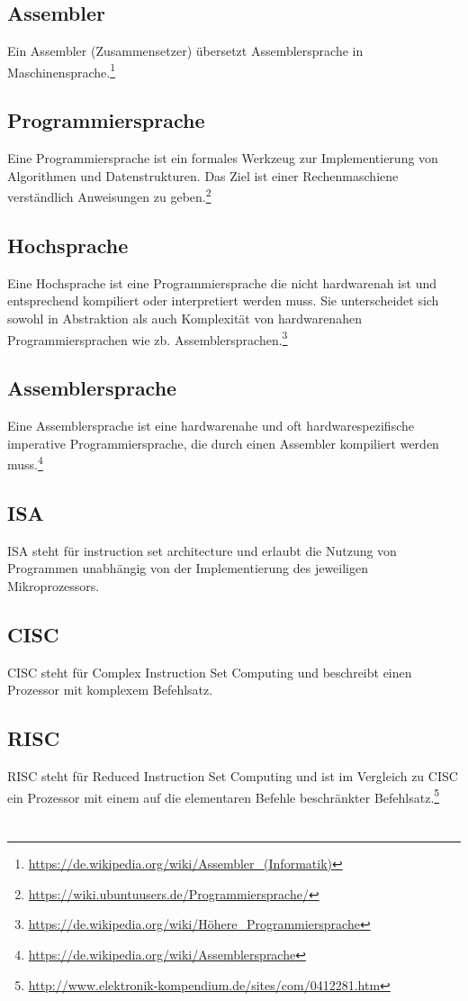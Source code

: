 \documentclass[
	11pt,								%
	parskip=half-,						%
	paper=a4,							%
	english,ngerman,					%
	]{scrartcl}							%
\begin{document}
\subsection*{Assembler}
Ein Assembler (Zusammensetzer) übersetzt Assemblersprache in Maschinensprache.\footnote{\url{https://de.wikipedia.org/wiki/Assembler\_(Informatik)}}

\subsection*{Programmiersprache}
Eine Programmiersprache ist ein formales Werkzeug zur Implementierung von Algorithmen und Datenstrukturen. Das Ziel ist einer Rechenmaschiene verständlich Anweisungen zu geben.\footnote{\url{https://wiki.ubuntuusers.de/Programmiersprache/}}

\subsection*{Hochsprache}
Eine Hochsprache ist eine Programmiersprache die nicht hardwarenah ist und entsprechend kompiliert oder interpretiert werden muss. Sie unterscheidet sich sowohl in Abstraktion als auch Komplexität von hardwarenahen Programmiersprachen wie zb. Assemblersprachen.\footnote{\url{https://de.wikipedia.org/wiki/Höhere\_Programmiersprache}}

\subsection*{Assemblersprache}
Eine Assemblersprache ist eine hardwarenahe und oft hardwarespezifische imperative Programmiersprache, die durch einen Assembler kompiliert werden muss.\footnote{\url{https://de.wikipedia.org/wiki/Assemblersprache}}

\subsection*{ISA}
ISA steht für instruction set architecture und erlaubt die Nutzung von Programmen unabhängig von der Implementierung des jeweiligen Mikroprozessors.

\subsection*{CISC}
CISC steht für Complex Instruction Set Computing und beschreibt einen Prozessor mit komplexem Befehlsatz.

\subsection*{RISC}
RISC steht für Reduced Instruction Set Computing und ist im Vergleich zu CISC ein Prozessor mit einem auf die elementaren Befehle beschränkter Befehlsatz.\footnote{\url{http://www.elektronik-kompendium.de/sites/com/0412281.htm}}

\section*{}



\end{document}
